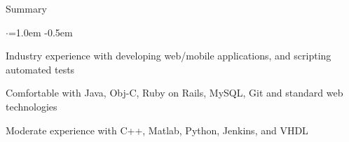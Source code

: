 \documentclass{resume} %
\begin{document}
	
	
	\begin{rSection}{Summary}
		\vspace {0.5em}
		\begin{list}{$\cdot$}{\leftmargin=1.0em}
			\itemsep -0.5em \vspace{-0.5em}
			\item Industry experience with developing web/mobile applications, and scripting automated tests
			\item Comfortable with Java, Obj-C, Ruby on Rails, MySQL, Git and standard web technologies
			\item Moderate experience with C++, Matlab, Python, Jenkins, and VHDL
			
		\end{list}
		\vspace{0.5em}
	\end{rSection}
	
	
	
\end{document}
